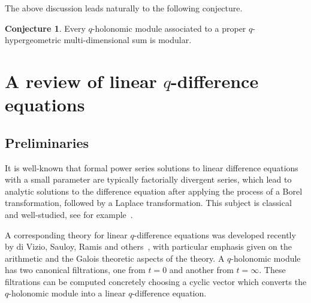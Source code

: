 \documentclass[12pt,reqno]{amsart}
\theoremstyle{definition}
\newtheorem{conjecture}[theorem]{Conjecture}
\begin{document}
The above discussion leads naturally to the following conjecture.

\begin{conjecture}
\label{conj.2}
Every $q$-holonomic module associated to a proper $q$-hypergeometric multi-dimensional
sum is modular.
\end{conjecture}


\section{A review of linear $q$-difference equations}
\label{sec.prelim}

\subsection{Preliminaries}
\label{sub.prelim}

It is well-known that formal power series solutions to linear difference equations
with a small parameter are typically factorially divergent series,
which lead to analytic solutions to the difference equation after applying the
process of a Borel transformation, followed by a Laplace transformation. This
subject is classical and well-studied, see for example~\cite{Bender,
  Costin:asymptotics,Miller:applied,Sauzin:divergent}.

A corresponding theory for linear $q$-difference equations was developed recently
by di Vizio, Sauloy, Ramis and others~\cite{Dreyfus:building,Hardouin,Ramis},
with particular emphasis given on the arithmetic and the Galois theoretic aspects
of the theory. A $q$-holonomic module has two canonical filtrations, one from $t=0$
and another from $t=\infty$. These filtrations can be computed concretely choosing
a cyclic vector which converts the $q$-holonomic module into a linear
$q$-difference equation.
\end{document}
